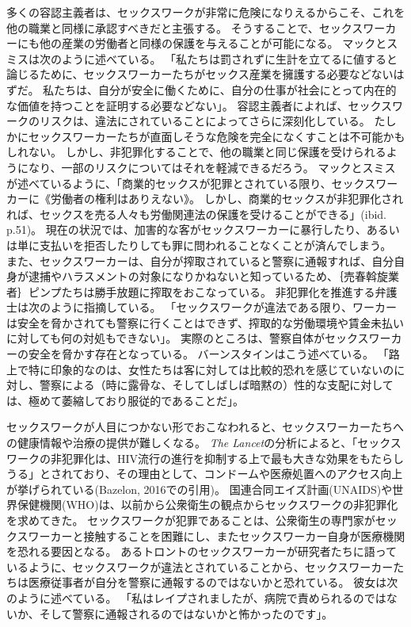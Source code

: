 \documentclass[paper=a4,book,openany]{jlreq}
\newcommand{\ig}[1]{}           %
\begin{document}
多くの容認主義者は、セックスワークが非常に危険になりえるからこそ、これを他の職業と同様に承認すべきだと主張する。
そうすることで、セックスワーカーにも他の産業の労働者と同様の保護を与えることが可能になる。
マックとスミスは次のように述べている。
「私たちは罰されずに生計を立てるに値すると論じるために、セックスワーカーたちがセックス産業を擁護する必要などないはずだ。
私たちは、自分が安全に働くために、自分の仕事が社会にとって内在的な価値を持つことを証明する必要などない」\citep[p.55]{mac18:_revol_prost}。
容認主義者によれば、セックスワークのリスクは、違法にされていることによってさらに深刻化している。
たしかにセックスワーカーたちが直面しそうな危険を完全になくすことは不可能かもしれない。
しかし、非犯罪化することで、他の職業と同じ保護を受けられるようになり、一部のリスクについてはそれを軽減できるだろう。
マックとスミスが述べているように、「商業的セックスが犯罪とされている限り、セックスワーカーに《労働者の権利はありえない》。
しかし、商業的セックスが非犯罪化されれば、セックスを売る人々も労働関連法の保護を受けることができる」(ibid. p.51)。
現在の状況では、加害的な客がセックスワーカーに暴行したり、あるいは単に支払いを拒否したりしても罪に問われることなくことが済んでしまう。
また、セックスワーカーは、自分が搾取されていると警察に通報すれば、自分自身が逮捕やハラスメントの対象になりかねないと知っているため、｛売春斡旋業者｝{ピンプ}たちは勝手放題に搾取をおこなっている。
非犯罪化を推進する弁護士は次のように指摘している。
「セックスワークが違法である限り、ワーカーは安全を脅かされても警察に行くことはできず、搾取的な労働環境や賃金未払いに対しても何の対処もできない」\citep{shugerman17:_prost_could_be_legal_calif}。
実際のところは、警察自体がセックスワーカーの安全を脅かす存在となっている。
バーンスタインはこう述べている。
「路上で特に印象的なのは、女性たちは客に対しては比較的恐れを感じていないのに対し、警察による（時に露骨な、そしてしばしば暗黙の）性的な支配に対しては、極めて萎縮しており服従的であることだ」\citep[p.108]{bernstein99:_whats_wrong_prost}。
\ig{Elizabeth Bernstein}

セックスワークが人目につかない形でおこなわれると、セックスワーカーたちへの健康情報や治療の提供が難しくなる。
\emph{The Lancet}の分析によると、「セックスワークの非犯罪化は、HIV流行の進行を抑制する上で最も大きな効果をもたらしうる」とされており、その理由として、コンドームや医療処置へのアクセス向上が挙げられている(Bazelon, 2016での引用)。
\nocite{bazelon16:_shoul_prost_be_crime}
国連合同エイズ計画(UNAIDS)や世界保健機関(WHO)は、以前から公衆衛生の観点からセックスワークの非犯罪化を求めてきた。
セックスワークが犯罪であることは、公衆衛生の専門家がセックスワーカーと接触することを困難にし、またセックスワーカー自身が医療機関を恐れる要因となる。
あるトロントのセックスワーカーが研究者たちに語っているように、セックスワークが違法とされていることから、セックスワーカーたちは医療従事者が自分を警察に通報するのではないかと恐れている。
彼女は次のように述べている。
「私はレイプされましたが、病院で責められるのではないか、そして警察に通報されるのではないかと怖かったのです」\citep{neal14:_street_based_sex_worker_needs_asses}。
\end{document}
